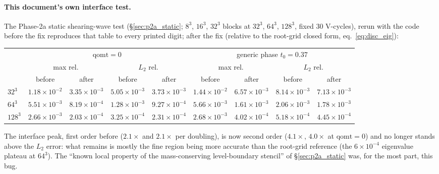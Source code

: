 \documentclass[11pt]{article}
\begin{document}
\paragraph{This document's own interface test.} The Phase-2a static shearing-wave test
(\S\ref{sec:p2a_static}; $8^3$, $16^3$, $32^3$ blocks at $32^3$, $64^3$, $128^3$, fixed 30
V-cycles), rerun with the code before the fix reproduces that table to every printed digit;
after the fix (relative to the root-grid closed form, eq.~\ref{eq:disc_eig}):
\begin{center}
\footnotesize\setlength{\tabcolsep}{3pt}
\begin{tabular}{@{}lcccccccc@{}}
\toprule
& \multicolumn{4}{c}{$\mathrm{qomt}=0$} & \multicolumn{4}{c}{generic phase $t_0=0.37$} \\
& \multicolumn{2}{c}{max rel.} & \multicolumn{2}{c}{$L_2$ rel.} & \multicolumn{2}{c}{max rel.} &
  \multicolumn{2}{c}{$L_2$ rel.} \\
& before & after & before & after & before & after & before & after \\
\midrule
$32^3$  & $1.18\times10^{-2}$ & $3.35\times10^{-3}$ & $5.05\times10^{-3}$ & $3.73\times10^{-3}$ &
          $1.44\times10^{-2}$ & $6.57\times10^{-3}$ & $8.14\times10^{-3}$ & $7.13\times10^{-3}$ \\
$64^3$  & $5.51\times10^{-3}$ & $8.19\times10^{-4}$ & $1.28\times10^{-3}$ & $9.27\times10^{-4}$ &
          $5.66\times10^{-3}$ & $1.61\times10^{-3}$ & $2.06\times10^{-3}$ & $1.78\times10^{-3}$ \\
$128^3$ & $2.66\times10^{-3}$ & $2.03\times10^{-4}$ & $3.25\times10^{-4}$ & $2.31\times10^{-4}$ &
          $2.68\times10^{-3}$ & $4.02\times10^{-4}$ & $5.18\times10^{-4}$ & $4.45\times10^{-4}$ \\
\bottomrule
\end{tabular}
\end{center}
The interface peak, first order before ($2.1\times$ and $2.1\times$ per doubling), is now second
order ($4.1\times$, $4.0\times$ at $\mathrm{qomt} = 0$) and no longer stands above the $L_2$
error: what remains is mostly the fine region being more accurate than the root-grid reference
(the $6\times10^{-4}$ eigenvalue plateau at $64^3$). The ``known local property of the
mass-conserving level-boundary stencil'' of \S\ref{sec:p2a_static} was, for the most part, this
bug.
\end{document}
